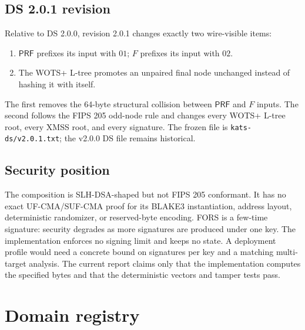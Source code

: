 \documentclass[runningheads]{llncs}
\newcommand{\PRF}{\mathsf{PRF}}
\begin{document}
\subsection{DS 2.0.1 revision}

Relative to DS 2.0.0, revision 2.0.1 changes exactly two wire-visible
items:
\begin{enumerate}[leftmargin=*]
\item $\PRF$ prefixes its input with $01$; $F$ prefixes its input with
  $02$.
\item The WOTS+ L-tree promotes an unpaired final node unchanged
  instead of hashing it with itself.
\end{enumerate}
The first removes the 64-byte structural collision between $\PRF$ and
$F$ inputs.  The second follows the FIPS 205 odd-node rule and changes
every WOTS+ L-tree root, every XMSS root, and every signature.  The
frozen file is \texttt{kats-ds/v2.0.1.txt}; the v2.0.0 DS file remains
historical.

\subsection{Security position}

The composition is SLH-DSA-shaped but not FIPS 205 conformant.  It has
no exact UF-CMA/SUF-CMA proof for its BLAKE3 instantiation, address
layout, deterministic randomizer, or reserved-byte encoding.  FORS is a
few-time signature: security degrades as more signatures are produced
under one key.  The implementation enforces no signing limit and keeps
no state.  A deployment profile would need a concrete bound on
signatures per key and a matching multi-target analysis.  The current
report claims only that the implementation computes the specified bytes
and that the deterministic vectors and tamper tests pass.

\section{Domain registry}
\label{sec:domains}
\end{document}
